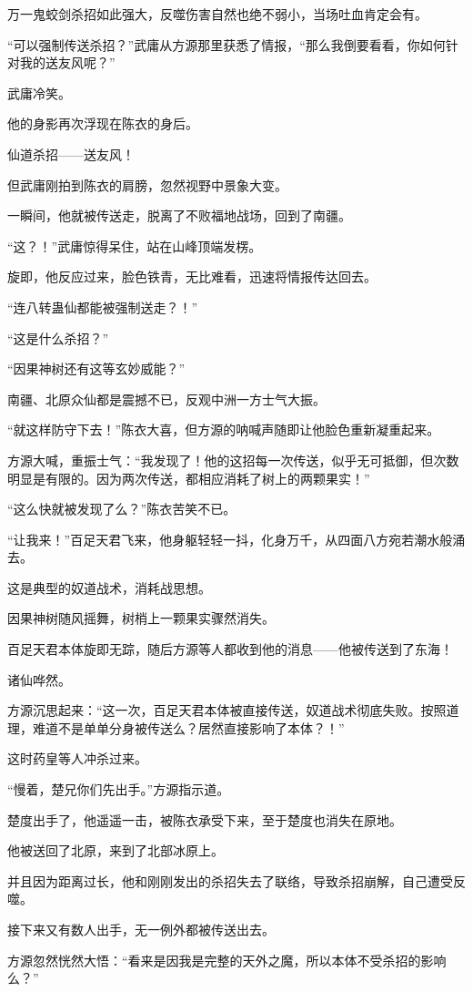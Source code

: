 \begin{this_body}
万一鬼蛟剑杀招如此强大，反噬伤害自然也绝不弱小，当场吐血肯定会有。

“可以强制传送杀招？”武庸从方源那里获悉了情报，“那么我倒要看看，你如何针对我的送友风呢？”

武庸冷笑。

他的身影再次浮现在陈衣的身后。

仙道杀招——送友风！

但武庸刚拍到陈衣的肩膀，忽然视野中景象大变。

一瞬间，他就被传送走，脱离了不败福地战场，回到了南疆。

“这？！”武庸惊得呆住，站在山峰顶端发楞。

旋即，他反应过来，脸色铁青，无比难看，迅速将情报传达回去。

“连八转蛊仙都能被强制送走？！”

“这是什么杀招？”

“因果神树还有这等玄妙威能？”

南疆、北原众仙都是震撼不已，反观中洲一方士气大振。

“就这样防守下去！”陈衣大喜，但方源的呐喊声随即让他脸色重新凝重起来。

方源大喊，重振士气：“我发现了！他的这招每一次传送，似乎无可抵御，但次数明显是有限的。因为两次传送，都相应消耗了树上的两颗果实！”

“这么快就被发现了么？”陈衣苦笑不已。

“让我来！”百足天君飞来，他身躯轻轻一抖，化身万千，从四面八方宛若潮水般涌去。

这是典型的奴道战术，消耗战思想。

因果神树随风摇舞，树梢上一颗果实骤然消失。

百足天君本体旋即无踪，随后方源等人都收到他的消息——他被传送到了东海！

诸仙哗然。

方源沉思起来：“这一次，百足天君本体被直接传送，奴道战术彻底失败。按照道理，难道不是单单分身被传送么？居然直接影响了本体？！”

这时药皇等人冲杀过来。

“慢着，楚兄你们先出手。”方源指示道。

楚度出手了，他遥遥一击，被陈衣承受下来，至于楚度也消失在原地。

他被送回了北原，来到了北部冰原上。

并且因为距离过长，他和刚刚发出的杀招失去了联络，导致杀招崩解，自己遭受反噬。

接下来又有数人出手，无一例外都被传送出去。

方源忽然恍然大悟：“看来是因我是完整的天外之魔，所以本体不受杀招的影响么？”


\end{this_body}
